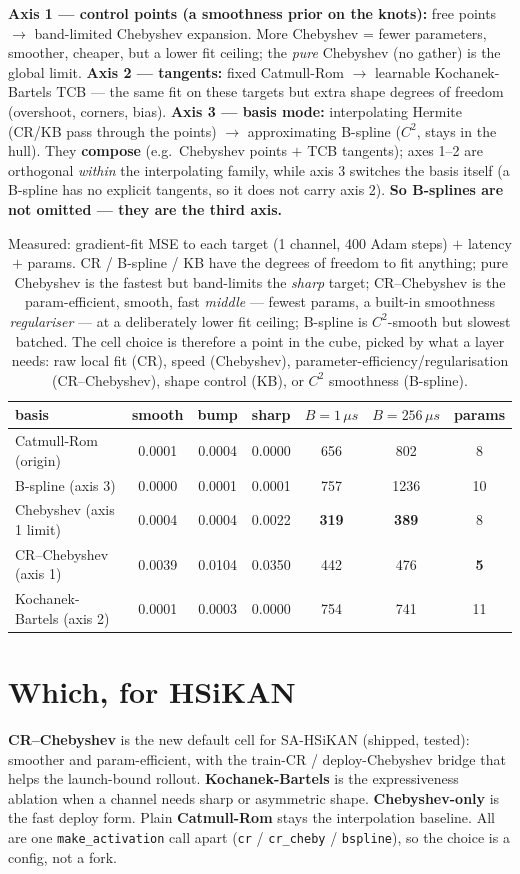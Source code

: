 \documentclass[11pt]{article}
\begin{document}
\textbf{Axis 1 --- control points (a smoothness prior on the knots):} free points $\to$ band-limited Chebyshev
expansion. More Chebyshev = fewer parameters, smoother, cheaper, but a lower fit ceiling; the \emph{pure}
Chebyshev (no gather) is the global limit. \textbf{Axis 2 --- tangents:} fixed Catmull-Rom $\to$ learnable
Kochanek-Bartels TCB --- the same fit on these targets but extra shape degrees of freedom (overshoot, corners,
bias). \textbf{Axis 3 --- basis mode:} interpolating Hermite (CR/KB pass through the points) $\to$ approximating
B-spline ($C^2$, stays in the hull). They \textbf{compose} (e.g.\ Chebyshev points $+$ TCB tangents); axes 1--2
are orthogonal \emph{within} the interpolating family, while axis 3 switches the basis itself (a B-spline has no
explicit tangents, so it does not carry axis 2). \textbf{So B-splines are not omitted --- they are the third
axis.}

\begin{table}[h]\centering\small
\begin{tabular}{lcccccc}
\toprule
basis & smooth & bump & sharp & $B{=}1\,\mu s$ & $B{=}256\,\mu s$ & params \\
\midrule
Catmull-Rom (origin) & 0.0001 & 0.0004 & 0.0000 & 656 & 802 & 8 \\
B-spline (axis 3) & 0.0000 & 0.0001 & 0.0001 & 757 & 1236 & 10 \\
Chebyshev (axis 1 limit) & 0.0004 & 0.0004 & 0.0022 & \textbf{319} & \textbf{389} & 8 \\
CR--Chebyshev (axis 1) & 0.0039 & 0.0104 & 0.0350 & 442 & 476 & \textbf{5} \\
Kochanek-Bartels (axis 2) & 0.0001 & 0.0003 & 0.0000 & 754 & 741 & 11 \\
\bottomrule
\end{tabular}
\caption{Measured: gradient-fit MSE to each target (1 channel, 400 Adam steps) $+$ latency $+$ params. CR / B-spline
/ KB have the degrees of freedom to fit anything; pure Chebyshev is the fastest but band-limits the \emph{sharp}
target; CR--Chebyshev is the param-efficient, smooth, fast \emph{middle} --- fewest params, a built-in smoothness
\emph{regulariser} --- at a deliberately lower fit ceiling; B-spline is $C^2$-smooth but slowest batched. The cell
choice is therefore a point in the cube, picked by what a layer needs: raw local fit (CR), speed (Chebyshev),
parameter-efficiency/regularisation (CR--Chebyshev), shape control (KB), or $C^2$ smoothness (B-spline).}
\end{table}

\section{Which, for HSiKAN}
\textbf{CR--Chebyshev} is the new default cell for SA-HSiKAN (shipped, tested): smoother and param-efficient, with
the train-CR / deploy-Chebyshev bridge that helps the launch-bound rollout. \textbf{Kochanek-Bartels} is the
expressiveness ablation when a channel needs sharp or asymmetric shape. \textbf{Chebyshev-only} is the fast
deploy form. Plain \textbf{Catmull-Rom} stays the interpolation baseline. All are one \texttt{make\_activation}
call apart (\texttt{cr} / \texttt{cr\_cheby} / \texttt{bspline}), so the choice is a config, not a fork.
\end{document}

